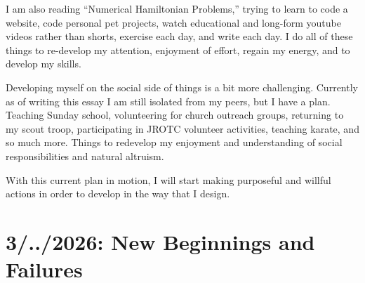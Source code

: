 I  am also reading “Numerical Hamiltonian Problems,” trying to learn to code a website, code personal pet projects, watch educational and long-form youtube videos rather than shorts, exercise each day, and write each day. I do all of these things to re-develop my attention, enjoyment of effort, regain my energy, and to develop my skills.

Developing myself on the social side of things is a bit more challenging. Currently as of writing this essay I am still isolated from my peers, but I have a plan. Teaching Sunday school, volunteering for church outreach groups, returning to my scout troop, participating in JROTC volunteer activities, teaching karate, and so much more. Things to redevelop my enjoyment and understanding of social responsibilities and natural altruism.

With this current plan in motion, I will start making purposeful and willful actions in order to develop in the way that I design.

\section{3/../2026: New Beginnings and Failures}
